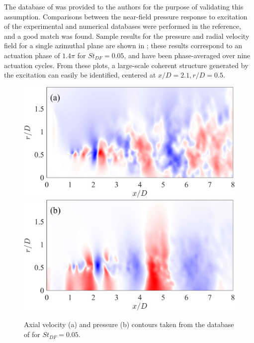 The database of \citet{Speth2014} was provided to the authors for the purpose of validating this assumption.
Comparisons between the near-field pressure response to excitation of the experimental and numerical databases were performed in the reference, and a good match was found.
Sample results for the pressure and radial velocity field for a single azimuthal plane are shown in ; these results correspond to an actuation phase of $1.4 \pi$ for $St_{DF} = 0.05$, and have been phase-averaged over nine actuation cycles.
From these plots, a large-scale coherent structure generated by the excitation can easily be identified, centered at $x/D = 2.1, r/D = 0.5$.
\begin{figure}
	\centering
		\includegraphics[width=0.6\linewidth]{Figures/LES_phavg_streamwise_Ur_v2.png}
		\includegraphics[width=0.6\linewidth]{Figures/LES_phavg_streamwise_p_v2.png}
	\caption{Axial velocity (a) and pressure (b) contours taken from the database of \citet{Speth2014} for $St_{DF} = 0.05$.}
	\label{fig:LES_streamwise_phavg}
\end{figure}

